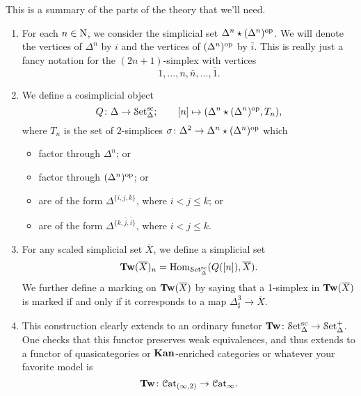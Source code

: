 \documentclass[main.tex]{subfiles}
\begin{document}
This is a summary of the parts of the theory that we'll need.
\begin{enumerate}
  \item For each $n \in \mathrm{N}$, we consider the simplicial set $\Delta^{n} \star (\Delta^{n})^{\mathrm{op}}$. We will denote the vertices of $\Delta^{n}$ by $i$ and the vertices of $(\Delta^{n})^{\mathrm{op}}$ by $\bar{i}$. This is really just a fancy notation for the $(2n+1)$-simplex with vertices
    \begin{equation*}
      1, \ldots, n, \bar{n}, \ldots, \bar{1}.
    \end{equation*}

  \item We define a cosimplicial object
    \begin{equation*}
      Q\colon \Delta \to \mathcal{S}\mathrm{et}_{\Delta}^{\mathrm{sc}};\qquad [n] \mapsto (\Delta^{n} \star (\Delta^{n})^{\mathrm{op}}, T_{n}),
    \end{equation*}
    where $T_{n}$ is the set of $2$-simplices $\sigma\colon \Delta^{2} \to \Delta^{n} \star (\Delta^{n})^{\mathrm{op}}$ which
    \begin{itemize}
      \item factor through $\Delta^{n}$; or
      \item factor through $(\Delta^{n})^{\mathrm{op}}$; or
      \item are of the form $\Delta^{\{i,j,\bar{k}\}}$, where $i < j \leq k$; or
      \item are of the form $\Delta^{\{k, \bar{j}, \bar{i}\}}$, where $i < j \leq k$.
    \end{itemize}

  \item For any scaled simplicial set $\overline{X}$, we define a simplicial set
    \begin{equation*}
      \mathbf{Tw}(\overline{X})_{n} = \mathrm{Hom}_{\mathcal{S}\mathrm{et}_{\Delta}^{\mathrm{sc}}}(Q([n]), \overline{X}).
    \end{equation*}
    We further define a marking on $\mathbf{Tw}(\overline{X})$ by saying that a 1-simplex in $\mathbf{Tw}(\overline{X})$ is marked if and only if it corresponds to a map $\Delta^{3}_{\sharp} \to \overline{X}$.

  \item This construction clearly extends to an ordinary functor $\mathbf{Tw}\colon \mathcal{S}\mathrm{et}_{\Delta}^{\mathrm{sc}} \to \mathcal{S}\mathrm{et}_{\Delta}^{+}$. One checks that this functor preserves weak equivalences, and thus extends to a functor of quasicategories or $\mathbf{Kan}$-enriched categories or whatever your favorite model is
    \begin{equation*}
      \mathbf{Tw}\colon \mathcal{C}\mathrm{at}_{(\infty,2)} \to \mathcal{C}\mathrm{at}_{\infty}.
    \end{equation*}


\end{enumerate}
\end{document}
